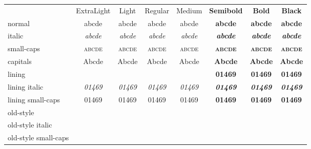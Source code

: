 \documentclass[11pt]{standalone}
\newcommand*\spA{abcde}
\newcommand*\spB{01469}
\newcommand*\spr[1][\spA]{& #1 & #1 & #1 & #1 & #1 & #1 & #1 \\}
\begin{document}
\begin{tabular}{
		>{\sourcesans}l
		>{\sourcesansextreme}c
		>{\sourcesanslight}c
		>{\sourcesans}c
		>{\sourcesansmedium}c
		>{\sourcesanslight\bfseries}c
		>{\sourcesans\bfseries}c
		>{\sourcesansextreme\bfseries}c }
	& ExtraLight & Light & Regular & Medium & Semibold & Bold & Black \\
	normal               \spr
	italic               \spr[\itshape\spA]
	small-caps           \spr[\scshape\spA]
	capitals             \spr[\MakeUppercase\spA]
	lining               \spr[\spB]
	lining italic        \spr[\itshape\spB]
	lining small-caps    \spr[\scshape\spB]
	old-style            \spr[\oldstylenums{\spB}]
	old-style italic     \spr[\oldstylenums{\itshape \spB}]
	old-style small-caps \spr[\oldstylenums{\scshape\spB}]
\end{tabular}
\end{document}
